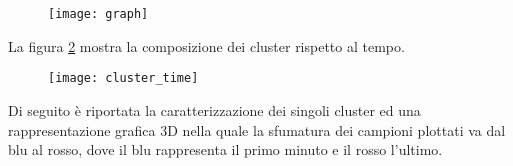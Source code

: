 \begin{figure}[!htbp]
  \centering
  \texttt{[image: graph]}
  \caption{}
  \label{graph}
\end{figure}
La figura \ref{cluster_time} mostra la composizione dei cluster rispetto al tempo.\\
\begin{figure}[!htbp]
  \centering
  \texttt{[image: cluster\_time]}
  \caption{}
  \label{cluster_time}
\end{figure}

\clearpage

Di seguito è riportata la caratterizzazione dei singoli cluster ed una rappresentazione
grafica 3D nella quale la sfumatura dei campioni plottati va dal blu al rosso, dove
il blu rappresenta il primo minuto e il rosso l'ultimo.

